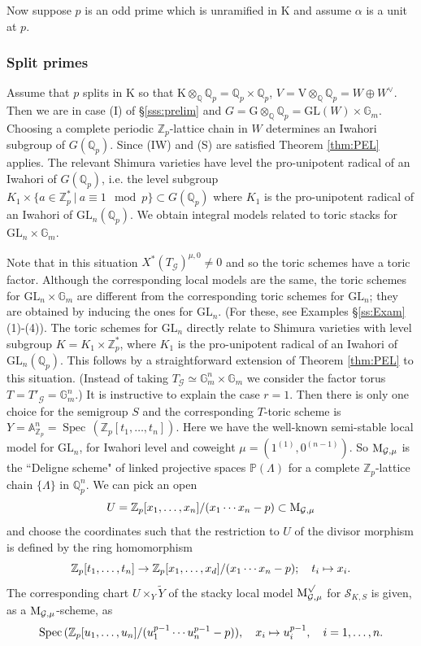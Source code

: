 \documentclass[reqno, 10pt]{amsart}
\makeatletter
\newcommand{\BA}{\ensuremath{\mathbb {A}}\xspace}
\newcommand{\BG}{\ensuremath{\mathbb {G}}\xspace}
\newcommand{\BP}{\ensuremath{\mathbb {P}}\xspace}
\newcommand{\BQ}{\ensuremath{\mathbb {Q}}\xspace}
\newcommand{\BZ}{\ensuremath{\mathbb {Z}}\xspace}
\newcommand{\CG}{\ensuremath{\mathcal {G}}\xspace}
\newcommand{\CS}{\ensuremath{\mathcal {S}}\xspace}
\newcommand{\RG}{\ensuremath{\mathrm {G}}\xspace}
\newcommand{\RK}{\ensuremath{\mathrm {K}}\xspace}
\newcommand{\RV}{\ensuremath{\mathrm {V}}\xspace}
\newcommand{\GL}{\mathrm{GL}}
\DeclareMathOperator{\Spec}{Spec\,}
\newcommand{\wt}{\widetilde}
\theoremstyle{definition}
\numberwithin{equation}{subsection}
\numberwithin{subsubsection}{subsection}
\renewcommand{\to}{%
   \ifbool{@display}{\longrightarrow}{\rightarrow}%
   }
\let\shortmapsto\mapsto
\renewcommand{\mapsto}{%
   \ifbool{@display}{\shortmapsto}{\shortmapsto}%
   }
\newcommand{\Mloc}{{\rm M}}
\makeatother
\begin{document}
Now suppose $p$ is an odd prime which is unramified in $\RK$ and assume $\alpha$ is a unit at $p$.

 \subsubsection{Split primes}\label{sss:split} Assume that $p$ splits in $\RK$ so that $\RK\otimes_\BQ\BQ_p=\BQ_p\times \BQ_p$, $V=\RV\otimes_\BQ\BQ_p=W\oplus W^\vee$. Then we are in case (I) of \S\ref{sss:prelim} and $G=\RG\otimes_\BQ\BQ_p=\GL(W) \times \BG_m$. Choosing a complete periodic $\BZ_p$-lattice chain in $W$ determines an Iwahori  subgroup of $G(\BQ_p)$. Since (IW) and (S) are satisfied Theorem \ref{thm:PEL} applies. The relevant Shimura varieties have level the 
pro-unipotent radical of an Iwahori of $G(\BQ_p)$, i.e. the level subgroup $K_1\times \{a\in \BZ_p^*\ |\ a\equiv 1\mod p\}\subset G(\BQ_p)$
where $K_1$ is the pro-unipotent radical of an Iwahori of $\GL_n(\BQ_p)$.  We obtain integral models related to toric stacks for 
$\GL_n\times\BG_m$. 

Note that in this situation $X^*(T_\CG)^{\mu, 0}\neq 0$ and so the toric schemes have a toric factor.
Although the corresponding local models are the same, the toric schemes for $\GL_n\times\BG_m$ are  different from the corresponding toric schemes for $\GL_n$;
they are obtained by inducing the ones for $\GL_n$. (For these, see Examples \S\ref{ss:Exam} (1)-(4)). The toric schemes for $\GL_n$ directly relate   to Shimura varieties with level subgroup $K=K_1\times \BZ_p^*$, where $K_1$ is the pro-unipotent radical of an Iwahori of $\GL_n(\BQ_p)$. This follows by a straightforward extension of Theorem \ref{thm:PEL} to this situation. (Instead of taking $T_\CG\simeq \BG^n_m\times\BG_m$ we consider the factor torus $T=T'_\CG=\BG^n_m$.) 
It is instructive to explain the case $r=1$. Then there is only one choice for the semigroup $S$ and the corresponding $T$-toric scheme is $Y=\BA^n_{\BZ_p}=\Spec(\BZ_p[t_1,\ldots, t_n])$. Here we have the well-known semi-stable local model for $\GL_n$, for Iwahori level and   coweight $\mu=(1^{(1)}, 0^{(n-1)})$. So $\Mloc_{\CG,\mu}$ is  the ``Deligne scheme" of linked projective spaces $\BP(\Lambda)$ for a complete $\BZ_p$-lattice chain $\{\Lambda\}$  in $\BQ_p^n$. We can pick an open 
\[
U=\BZ_p[x_1, \ldots , x_n]/(x_1 \cdots x_n-p)\subset \Mloc_{\CG,\mu} 
\]
and choose the coordinates such that the restriction to $U$ of the divisor morphism  is   defined by the ring homomorphism
\[
\BZ_p[t_1,\ldots, t_n ] \to \BZ_p[x_1, \ldots , x_d]/(x_1\cdots x_n-p); \quad t_i\mapsto x_i.
\]
The corresponding chart $U\times_Y\wt Y$ of the stacky local model $\Mloc_{\CG,\mu}^{\sqrt{}}$ for $\CS_{K,S}$ is given, as a $\Mloc_{\CG,\mu}$-scheme, as 
\begin{equation}\label{dr-eq}
 \Spec(\BZ_p[u_1,\ldots, u_n]/(u^{p-1}_1\cdots u^{p-1}_n -p)), \quad x_i\mapsto u^{p-1}_i, \quad i=1,\ldots, n.
\end{equation} 
 
\end{document}
